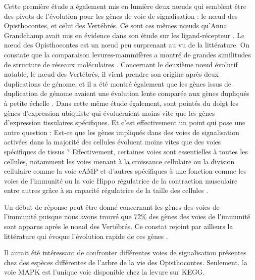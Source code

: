 \par Cette première étude a également mis en lumière deux nœuds qui semblent être des pivots de l’évolution pour les gènes de voie de signalisation : le nœud des Opisthocontes, et celui des Vertébrés. Ce sont ces mêmes nœuds qu’Anna Grandchamp avait mis en évidence dans son étude sur les ligand-récepteur \parencite{grandchamp_synchronous_2018}. Le nœud des Opisthocontes est un nœud peu surprenant au vu de la littérature. On constate que la comparaison levures-mammifères a montré de grandes similitudes de structure de réseaux moléculaires \parencite{cross_evolution_2011}. Concernant le deuxième nœud évolutif notable, le nœud des Vertébrés, il vient prendre son origine après deux duplications de génome, et il a été montré également que les gènes issus de duplication de génome avaient une évolution lente comparée aux gènes dupliqués à petite échelle \parencite{satake_evolution_2012}. Dans cette même étude également, sont pointés du doigt les gènes d’expression ubiquiste qui évolueraient moins vite que les gènes d’expression tissulaires spécifiques. Et c’est effectivement un point qui pose une autre question : Est-ce que les gènes impliqués dans des voies de signalisation activées dans la majorité des cellules évoluent moins vites que des voies spécifiques de tissus ? Effectivement, certaines voies sont essentielles à toutes les cellules, notamment les voies menant à la croissance cellulaire ou la division cellulaire comme la voie cAMP \parencite{sassone-corsi_cyclic_2012} et d’autres spécifiques à une fonction comme les voies de l’immunité ou la voie Hippo régulatrice de la contraction musculaire entre autres grâce à sa capacité régulatrice de la taille des cellules \parencite{zhao_hippo_2011}. 
\par Un début de réponse peut être donné concernant les gènes des voies de l’immunité puisque nous avons trouvé que 72\% des gènes des voies de l’immunité sont apparus après le nœud des Vertébrés. Ce constat rejoint par ailleurs la littérature qui évoque l’évolution rapide de ces gènes \parencite{cooper_evolution_2006, schlesinger_coevolutionary_2014}. 
\par Il aurait été intéressant de confronter différentes voies de signalisation présentes chez des espèces différentes de l’arbre de la vie des Opisthocontes. Seulement, la voie MAPK est l’unique voie disponible chez la levure sur KEGG.
